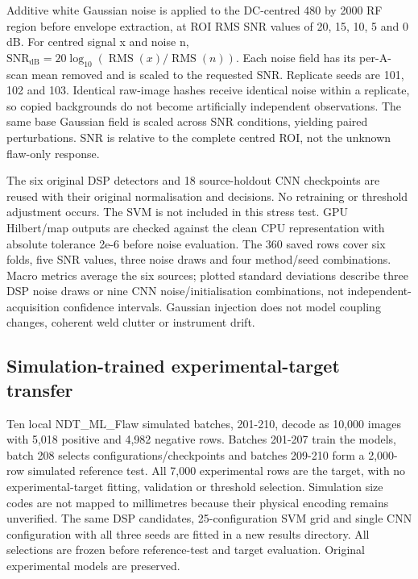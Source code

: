 \documentclass[11pt,a4paper]{article}
\begin{document}
Additive white Gaussian noise is applied to the DC-centred 480 by 2000 RF region before envelope extraction, at ROI RMS SNR values of 20, 15, 10, 5 and 0 dB. For centred signal x and noise n, \(\mathrm{SNR}_{\mathrm{dB}}=20\log_{10}\!\left(\operatorname{RMS}(x)/\operatorname{RMS}(n)\right)\). Each noise field has its per-A-scan mean removed and is scaled to the requested SNR. Replicate seeds are 101, 102 and 103. Identical raw-image hashes receive identical noise within a replicate, so copied backgrounds do not become artificially independent observations. The same base Gaussian field is scaled across SNR conditions, yielding paired perturbations. SNR is relative to the complete centred ROI, not the unknown flaw-only response.

The six original DSP detectors and 18 source-holdout CNN checkpoints are reused with their original normalisation and decisions. No retraining or threshold adjustment occurs. The SVM is not included in this stress test. GPU Hilbert/map outputs are checked against the clean CPU representation with absolute tolerance 2e-6 before noise evaluation. The 360 saved rows cover six folds, five SNR values, three noise draws and four method/seed combinations. Macro metrics average the six sources; plotted standard deviations describe three DSP noise draws or nine CNN noise/initialisation combinations, not independent-acquisition confidence intervals. Gaussian injection does not model coupling changes, coherent weld clutter or instrument drift.

\subsection{Simulation-trained experimental-target transfer}

Ten local NDT\_ML\_Flaw simulated batches, 201-210, decode as 10,000 images with 5,018 positive and 4,982 negative rows. Batches 201-207 train the models, batch 208 selects configurations/checkpoints and batches 209-210 form a 2,000-row simulated reference test. All 7,000 experimental rows are the target, with no experimental-target fitting, validation or threshold selection. Simulation size codes are not mapped to millimetres because their physical encoding remains unverified. The same DSP candidates, 25-configuration SVM grid and single CNN configuration with all three seeds are fitted in a new results directory. All selections are frozen before reference-test and target evaluation. Original experimental models are preserved.
\end{document}
